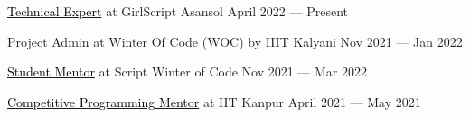 \href{https://media-exp1.licdn.com/dms/image/C4D2DAQFe_g8MmZZCKA/profile-treasury-image-shrink_1280_1280/0/1650306774998?e=2147483647&v=beta&t=hX0gnDjzG83VSMkTiWUa4FVBo8SGNfmNlMMq7jtOg40}{\textcolor{black}{Technical Expert}} at GirlScript Asansol \hfill April 2022 --- Present

Project Admin at Winter Of Code (WOC) by IIIT Kalyani \hfill Nov 2021 --- Jan 2022

\href{https://media-exp2.licdn.com/dms/image/C4D2DAQEA_6LRDAI8eg/profile-treasury-document-images_800/1/1648468599618?e=1657756800&v=beta&t=hL2_ffWTPAjbkLPQvlRSlOXnvwtfpUXJf3YrcgO-8Ao}{\textcolor{black}{Student Mentor}} at Script Winter of Code \hfill   Nov 2021 --- Mar 2022

\href{https://netcredential.com/verify/PX6Ofd205a}{\textcolor{black}{Competitive Programming Mentor}} at IIT Kanpur \hfill April 2021 --- May 2021